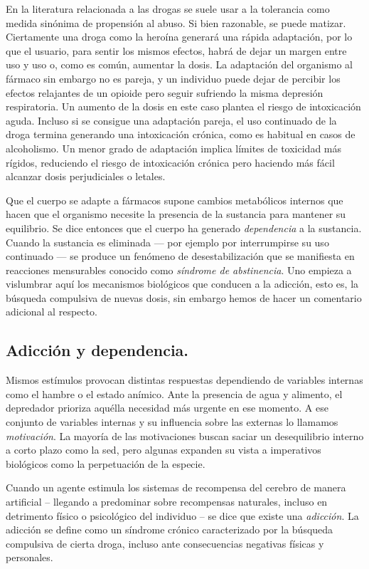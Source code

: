 En la literatura relacionada a las drogas se suele usar a la tolerancia como medida sinónima de propensión al abuso. Si bien razonable, se puede matizar. Ciertamente una droga como la heroína generará una rápida adaptación, por lo que el usuario, para sentir los mismos efectos, habrá de dejar un margen entre uso y uso o, como es común, aumentar la dosis. La adaptación del organismo al fármaco sin embargo no es pareja, y un individuo puede dejar de percibir los efectos relajantes de un opioide pero seguir sufriendo la misma depresión respiratoria. Un aumento de la dosis en este caso plantea el riesgo de intoxicación aguda. Incluso si se consigue una adaptación pareja, el uso continuado de la droga termina generando una intoxicación crónica, como es habitual en casos de alcoholismo. Un menor grado de adaptación implica límites de toxicidad más rígidos, reduciendo el riesgo de intoxicación crónica pero haciendo más fácil alcanzar dosis perjudiciales o letales.

Que el cuerpo se adapte a fármacos supone cambios metabólicos internos que hacen que el organismo necesite la presencia de la sustancia para mantener su equilibrio. Se dice entonces que el cuerpo ha generado \textit{dependencia} a la sustancia. Cuando la sustancia es eliminada --- por ejemplo por interrumpirse su uso continuado --- se produce un fenómeno de desestabilización que se manifiesta en reacciones mensurables conocido como \textit{síndrome de abstinencia}. Uno empieza a vislumbrar aquí los mecanismos biológicos que conducen a la adicción, esto es, la búsqueda compulsiva de nuevas dosis, sin embargo hemos de hacer un comentario adicional al respecto.

\newpage

\subsection{Adicción y dependencia.}

Mismos estímulos provocan distintas respuestas dependiendo de variables internas como el hambre o el estado anímico. Ante la presencia de agua y alimento, el depredador prioriza aquélla necesidad más urgente en ese momento. A ese conjunto de variables internas y su influencia sobre las externas lo llamamos \textit{motivación}. La mayoría de las motivaciones buscan saciar un desequilibrio interno a corto plazo como la sed, pero algunas expanden su vista a imperativos biológicos como la perpetuación de la especie.

Cuando un agente estimula los sistemas de recompensa del cerebro de manera artificial – llegando a predominar sobre recompensas naturales, incluso en detrimento físico o psicológico del individuo – se dice que existe una \textit{adicción}. La adicción se define como un síndrome crónico caracterizado por la búsqueda compulsiva de cierta droga, incluso ante consecuencias negativas físicas y personales.

